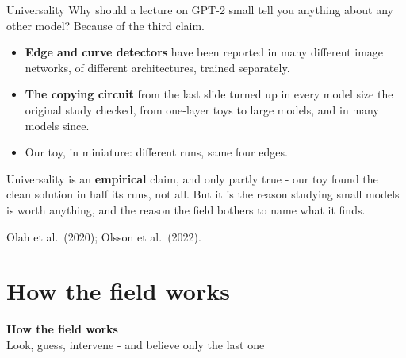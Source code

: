 \documentclass[aspectratio=169]{beamer}
\newcommand{\watchbox}[1]{%
  \begin{tcolorbox}[colback=armorange!12, colframe=armorange, boxrule=0.6pt, arc=2pt]
  #1
  \end{tcolorbox}}
\newcommand{\sectiontransition}[2]{%
  \begin{frame}[plain]
    \vfill
    \begin{center}
      {\Huge\bfseries\color{popblue} #1}\\[1.1em]
      {\large #2}
    \end{center}
    \vfill
  \end{frame}}
\begin{document}
\begin{frame}{Universality}
  \vspace{0.6em}
  Why should a lecture on GPT-2 small tell you anything about any other model? Because of the third
  claim.

  \vspace{0.7em}
  \begin{itemize}
    \item \textbf{Edge and curve detectors} have been reported in many different image networks,
      of different architectures, trained separately.
    \item \textbf{The copying circuit} from the last slide turned up in every model size the
      original study checked, from one-layer toys to large models, and in many models since.
    \item Our toy, in miniature: different runs, same four edges.
  \end{itemize}

  \vspace{0.8em}
  \watchbox{Universality is an \textbf{empirical} claim, and only partly true - our toy found the
  clean solution in half its runs, not all. But it is the reason studying small models is worth
  anything, and the reason the field bothers to name what it finds.}

  \vspace{0.3em}
  {\footnotesize Olah et al.\ (2020); Olsson et al.\ (2022).}
\end{frame}

\section{How the field works}
\sectiontransition{How the field works}{Look, guess, intervene - and believe only the last one}
\end{document}
